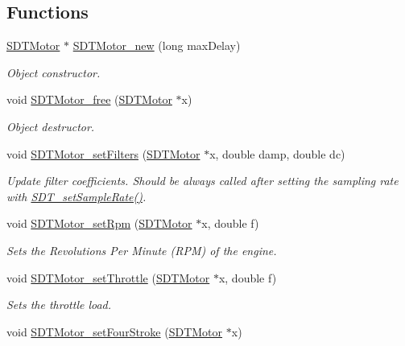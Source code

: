 \subsection*{Functions}
\begin{DoxyCompactItemize}
\item 
\hyperlink{group__motor_ga71a2e0e68d27c741a163f1b9819acb1b}{S\+D\+T\+Motor} $\ast$ \hyperlink{group__motor_gae43489459dcd0fbca5439691c7a1adb0}{S\+D\+T\+Motor\+\_\+new} (long max\+Delay)
\begin{DoxyCompactList}\small\item\em Object constructor. \end{DoxyCompactList}\item 
void \hyperlink{group__motor_gab676597b28c2a4ea89e235531b0dc447}{S\+D\+T\+Motor\+\_\+free} (\hyperlink{group__motor_ga71a2e0e68d27c741a163f1b9819acb1b}{S\+D\+T\+Motor} $\ast$x)
\begin{DoxyCompactList}\small\item\em Object destructor. \end{DoxyCompactList}\item 
void \hyperlink{group__motor_gad6a38e1945353b9a4eeab3950218fe92}{S\+D\+T\+Motor\+\_\+set\+Filters} (\hyperlink{group__motor_ga71a2e0e68d27c741a163f1b9819acb1b}{S\+D\+T\+Motor} $\ast$x, double damp, double dc)
\begin{DoxyCompactList}\small\item\em Update filter coefficients. Should be always called after setting the sampling rate with \hyperlink{group__common_gad76f7b9f128e79164c76764be6e03be8}{S\+D\+T\+\_\+set\+Sample\+Rate()}. \end{DoxyCompactList}\item 
void \hyperlink{group__motor_gadb7382560e21de6e085b1a38dc0f10da}{S\+D\+T\+Motor\+\_\+set\+Rpm} (\hyperlink{group__motor_ga71a2e0e68d27c741a163f1b9819acb1b}{S\+D\+T\+Motor} $\ast$x, double f)
\begin{DoxyCompactList}\small\item\em Sets the Revolutions Per Minute (R\+P\+M) of the engine. \end{DoxyCompactList}\item 
void \hyperlink{group__motor_gab4ed2474a1faff5f6ff258c728e9fa73}{S\+D\+T\+Motor\+\_\+set\+Throttle} (\hyperlink{group__motor_ga71a2e0e68d27c741a163f1b9819acb1b}{S\+D\+T\+Motor} $\ast$x, double f)
\begin{DoxyCompactList}\small\item\em Sets the throttle load. \end{DoxyCompactList}\item 
\hypertarget{group__motor_ga4bf849a8cde98def844917176a2294a0}{}void \hyperlink{group__motor_ga4bf849a8cde98def844917176a2294a0}{S\+D\+T\+Motor\+\_\+set\+Four\+Stroke} (\hyperlink{group__motor_ga71a2e0e68d27c741a163f1b9819acb1b}{S\+D\+T\+Motor} $\ast$x)\label{group__motor_ga4bf849a8cde98def844917176a2294a0}


\end{DoxyCompactItemize}
